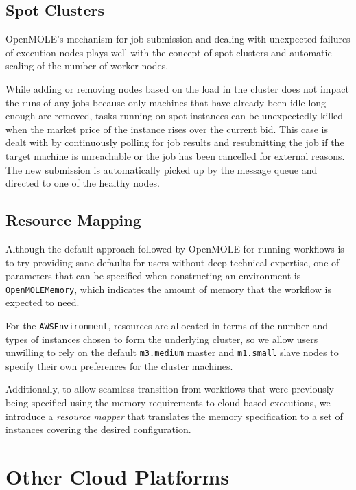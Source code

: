 \subsection{Spot Clusters}

OpenMOLE's mechanism for job submission and dealing with unexpected failures of execution nodes plays well with the concept of spot clusters and automatic scaling of the number of worker nodes.

While adding or removing nodes based on the load in the cluster does not impact the runs of any jobs because only machines that have already been idle long enough are removed, tasks running on spot instances can be unexpectedly killed when the market price of the instance rises over the current bid. This case is dealt with by continuously polling for job results and resubmitting the job if the target machine is unreachable or the job has been cancelled for external reasons. The new submission is automatically picked up by the message queue and directed to one of the healthy nodes.

\subsection{Resource Mapping}

Although the default approach followed by OpenMOLE for running workflows is to try providing sane defaults for users without deep technical expertise, one of parameters that can be specified when constructing an environment is \verb|OpenMOLEMemory|, which indicates the amount of memory that the workflow is expected to need.

For the \verb|AWSEnvironment|, resources are allocated in terms of the number and types of instances chosen to form the underlying cluster, so we allow users unwilling to rely on the default \verb|m3.medium| master and \verb|m1.small| slave nodes to specify their own preferences for the cluster machines.

Additionally, to allow seamless transition from workflows that were previously being specified using the memory requirements to cloud-based executions, we introduce a \textit{resource mapper} that translates the memory specification to a set of instances covering the desired configuration.

\section{Other Cloud Platforms}

